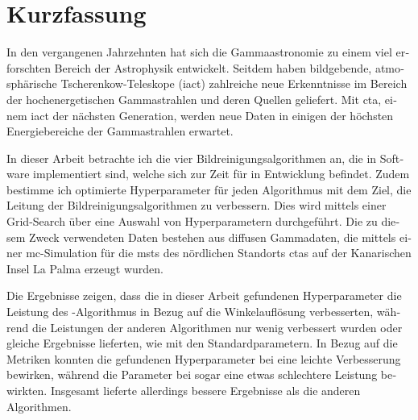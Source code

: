 \section*{Kurzfassung}
\begin{otherlanguage}{ngerman}
In den vergangenen Jahrzehnten hat sich die Gammaastronomie zu einem viel erforschten Bereich der
Astrophysik entwickelt. Seitdem haben bildgebende, atmosphärische Tscherenkow-Teleskope (\gls{iact})
zahlreiche neue Erkenntnisse im Bereich der hochenergetischen Gammastrahlen und deren Quellen geliefert.
Mit \gls{cta}, einem \gls{iact} der nächsten Generation, werden neue Daten in einigen der höchsten
Energiebereiche der Gammastrahlen erwartet.

In dieser Arbeit betrachte ich die vier Bildreinigungsalgorithmen an, die in Software \ctapipe{} implementiert
sind, welche sich zur Zeit für \cta{} in Entwicklung befindet. Zudem bestimme ich optimierte
Hyperparameter für jeden Algorithmus mit dem Ziel, die Leitung der Bildreinigungsalgorithmen zu verbessern.
Dies wird mittels einer Grid-Search über eine Auswahl von Hyperparametern durchgeführt. Die zu diesem
Zweck verwendeten Daten bestehen aus diffusen Gammadaten, die mittels einer \gls{mc}-Simulation für die
\glspl{mst} des nördlichen Standorts \gls{cta}s auf der Kanarischen Insel La Palma erzeugt wurden.

Die Ergebnisse zeigen, dass die in dieser Arbeit gefundenen Hyperparameter die Leistung des \tcc{}-Algorithmus
in Bezug auf die Winkelauflösung verbesserten, während die Leistungen der anderen Algorithmen nur wenig
verbessert wurden oder gleiche Ergebnisse lieferten, wie mit den Standardparametern.
In Bezug auf die Metriken konnten die gefundenen Hyperparameter bei \tcc{} eine leichte Verbesserung
bewirken, während die Parameter bei \fact{} sogar eine etwas schlechtere Leistung bewirkten.
Insgesamt lieferte \fact{} allerdings bessere Ergebnisse als die anderen Algorithmen.
\end{otherlanguage}
\glsresetall
